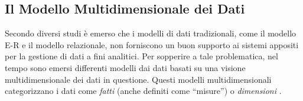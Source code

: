 \subsection{Il Modello Multidimensionale dei Dati}

Secondo diversi studi è emerso che i modelli di dati tradizionali, come il modello E-R e il modello relazionale, non forniscono un buon supporto ai sistemi appositi per la gestione di dati a fini analitici. Per sopperire a tale problematica, nel tempo sono emersi differenti modelli dai dati basati su una visione multidimensionale dei dati in questione. Questi modelli multidimensionali categorizzano i dati come \textit{fatti} (anche definiti come “misure”) o \textit{dimensioni} \cite{ieee_multidimensional_data_modeling}.

